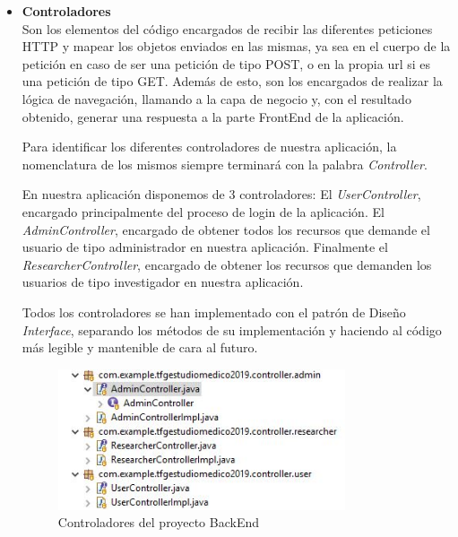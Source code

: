         \begin{itemize}
            \item\textbf{Controladores}  \\
            Son los elementos del código encargados de recibir las diferentes peticiones HTTP y mapear los objetos enviados en las mismas, ya sea en el cuerpo de la petición en caso de ser una petición de tipo POST, o en la propia url si es una petición de tipo GET. Además de esto, son los encargados de realizar la lógica de navegación, llamando a la capa de negocio y, con el resultado obtenido, generar una respuesta a la parte FrontEnd de la aplicación.
            \newline
            
            Para identificar los diferentes controladores de nuestra aplicación, la nomenclatura de los mismos siempre terminará con la palabra \textit{Controller}.
            \newline
            
            En nuestra aplicación disponemos de 3 controladores: El \textit{UserController}, encargado principalmente del proceso de login de la aplicación. El \textit{AdminController}, encargado de obtener todos los recursos que demande el usuario de tipo administrador en nuestra aplicación. Finalmente el \textit{ResearcherController}, encargado de obtener los recursos que demanden los usuarios de tipo investigador en nuestra aplicación.
            \newline
            
            Todos los controladores se han implementado con el patrón de Diseño \textit{Interface}, separando los métodos de su implementación y haciendo al código más legible y mantenible de cara al futuro.
            \newline
            
                \begin{figure}[h]
                    \centering
                     \includegraphics[width=0.8\textwidth]{images/controllers.JPG}
                    \caption{Controladores del proyecto BackEnd}
                \end{figure}
                

\end{itemize}
